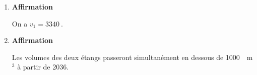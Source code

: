 \documentclass[10pt]{article}
\providecommand{\np}[2][]{{#2~#1}}
\begin{document}
\begin{enumerate}[start=3]
	\item \textbf{Affirmation}

	On a $v_1 = \np{3340}$.

	\item \textbf{Affirmation}

	Les volumes des deux étangs passeront simultanément en dessous de \np{1000}~m$^3$ à partir de 2036.
\end{enumerate}

\medskip
\end{document}
